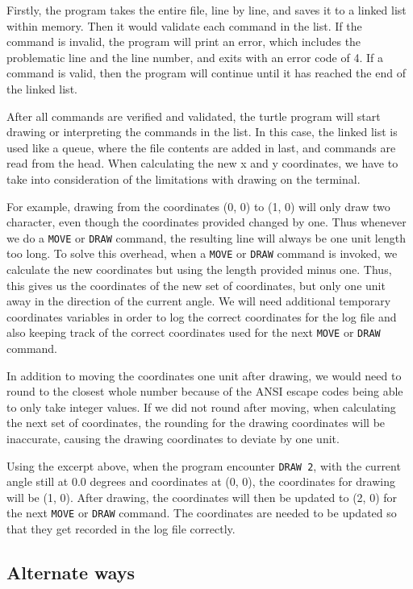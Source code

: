 \documentclass[a4paper, 12pt, titlepage]{article}
\newcommand{\code}[1]{\small\texttt{#1}\normalsize}
\begin{document}
Firstly, the program takes the entire file, line by line, and saves it to
a linked list within memory. Then it would validate each command in the list.
If the command is invalid, the program will print an error, which includes
the problematic line and the line number, and exits with an error code of 4.
If a command is valid, then the program will continue until it has reached
the end of the linked list.

After all commands are verified and validated, the turtle program will start
drawing or interpreting the commands in the list. In this case, the linked
list is used like a queue, where the file contents are added in last, and
commands are read from the head. When calculating the new x and y coordinates,
we have to take into consideration of the limitations with drawing on the
terminal.

For example, drawing from the coordinates (0, 0) to (1, 0) will only draw
two character, even though the coordinates provided changed by one.
Thus whenever we do a \code{MOVE} or \code{DRAW} command, the resulting
line will always be one unit length too long. To solve this overhead,
when a \code{MOVE} or \code{DRAW} command is invoked, we calculate the
new coordinates but using the length provided minus one. Thus, this gives
us the coordinates of the new set of coordinates, but only one unit away
in the direction of the current angle. We will need additional temporary
coordinates variables in order to log the correct coordinates for the log
file and also keeping track of the correct coordinates used for the next
\code{MOVE} or \code{DRAW} command.

In addition to moving the coordinates one unit after drawing, we would need to
round to the closest whole number because of the ANSI escape codes being able
to only take integer values. If we did not round after moving, when
calculating the next set of coordinates, the rounding for the drawing
coordinates will be inaccurate, causing the drawing coordinates to deviate by
one unit.

Using the excerpt above, when the program encounter \code{DRAW 2},
with the current angle still at 0.0 degrees and coordinates at (0, 0),
the coordinates for drawing will be (1, 0). After drawing, the coordinates
will then be updated to (2, 0) for the next \code{MOVE} or \code{DRAW}
command. The coordinates are needed to be updated so that they get recorded
in the log file correctly.

\subsection{Alternate ways}
\end{document}
